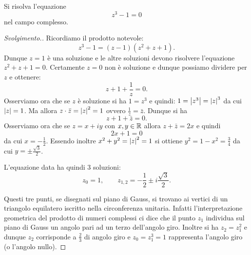 \begin{exercise}
Si risolva l'equazione 
\[ 
 z^3 - 1 = 0
\]
nel campo complesso.
\end{exercise}
%
\begin{proof}[Svolgimento.]
Ricordiamo il prodotto notevole:
\[
  z^3 - 1 = (z-1)(z^2+z+1).
\]
Dunque $z=1$ è una soluzione e le altre soluzioni devono risolvere 
l'equazione $z^2+z+1=0$. 
Certamente $z=0$ non è soluzione e dunque possiamo dividere per $z$ 
e ottenere:
\[
  z + 1 + \frac 1 z = 0.
\]
Osserviamo ora che se $z$ è soluzione si ha $1=z^3$
e quindi: $1 = {\left|z^3\right|}= {\left|z\right|}^3$ da cui ${\left|z\right|} = 1$.
Ma allora $z\cdot \bar z = {\left|z\right|}^2 = 1$ ovvero $\frac 1 z = \bar z$.
Dunque si ha 
\[
    z + 1 + \bar z = 0.
\]
Osserviamo ora che se $z=x+iy$ con $x,y\in {\mathbb R}$ allora $z+\bar z = 2x$
e quindi 
\[
    2x + 1 = 0 
\]
da cui $x=-\frac 1 2$. Essendo inoltre $x^2+y^2={\left|z\right|}^2=1$ si ottiene
$y^2 = 1-x^2 = \frac 3 4$ da cui $y=\pm \frac{\sqrt 3}{2}$.

L'equazione data ha quindi $3$ soluzioni:
\[
z_0 = 1, \qquad 
z_{1,2} = -\frac 1 2 \pm i \frac{\sqrt 3} 2.
\]

Questi tre punti, se disegnati sul piano di Gauss, si trovano 
ai vertici di un triangolo equilatero iscritto nella circonferenza unitaria.
Infatti l'interpretazione geometrica del prodotto di numeri complessi ci dice 
che il punto $z_1$ individua sul piano di Gauss un angolo pari 
ad un terzo dell'angolo giro. Inoltre si ha $z_2 = z_1^2$ e dunque 
$z_2$ corrisponde a $\frac 2 3$ di angolo giro e $z_0=z_1^3 = 1$ rappresenta 
l'angolo giro (o l'angolo nullo).
\end{proof}
